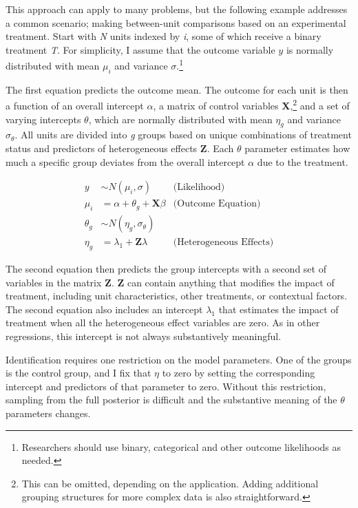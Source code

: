 \documentclass[12pt]{article}
\begin{document}
This approach can apply to many problems, but the following example addresses a common scenario; making between-unit comparisons based on an experimental treatment.    
Start with \textit{N} units indexed by \textit{i}, some of which receive a binary treatment \textit{T}.
For simplicity, I assume that the outcome variable ${y}$ is normally distributed with mean $\mu_i$ and variance $\sigma$.\footnote{Researchers should use binary, categorical and other outcome likelihoods as needed.}


The first equation predicts the outcome mean. 
The outcome for each unit is then a function of an overall intercept $\alpha$, a matrix of control variables \textbf{X},\footnote{This can be omitted, depending on the application. Adding additional grouping structures for more complex data is also straightforward.} and a set of varying intercepts $\theta$, which are normally distributed with mean $\eta_g$ and variance $\sigma_\theta$. 
All units are divided into \textit{g} groups based on unique combinations of treatment status and predictors of heterogeneous effects \textbf{Z}. 
Each $\theta$ parameter estimates how much a specific group deviates from the overall intercept $\alpha$ due to the treatment. 


\begin{equation}
\begin{aligned}
y &\sim N(\mu_i, \sigma) &\text{(Likelihood)} \\
\mu_i &= \alpha + \theta_g + \textbf{X} \beta &\text{(Outcome Equation)}  \\
\theta_g &\sim N(\eta_g, \sigma_\theta) \\ 
\eta_g &= \lambda_1 + \textbf{Z} \lambda &\text{(Heterogeneous Effects)} 
\end{aligned}
\end{equation}


The second equation then predicts the group intercepts with a second set of variables in the matrix \textbf{Z}. 
\textbf{Z} can contain anything that modifies the impact of treatment, including unit characteristics, other treatments, or contextual factors. 
The second equation also includes an intercept $\lambda_1$ that estimates the impact of treatment when all the heterogeneous effect variables are zero.
As in other regressions, this intercept is not always substantively meaningful.  


Identification requires one restriction on the model parameters. 
One of the groups is the control group, and I fix that $\eta$ to zero by setting the corresponding intercept and predictors of that parameter to zero. 
Without this restriction, sampling from the full posterior is difficult and the substantive meaning of the $\theta$ parameters changes. 
\end{document}
